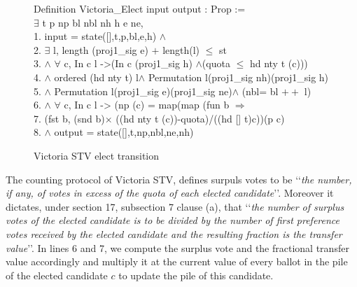\documentclass{llncs}
\begin{document}
\begin{scriptsize}
\begin{figure}[b]
{\selectfont
 Definition Victoria\_Elect \textsf{input} \textsf{output} : Prop :=\\ $\exists$ t p np bl nbl nh h e ne, \\
     1. \textsf{input} = \textsf{state}([],t,p,bl,e,h) $\wedge$\\
     2. $\exists$ l, \textsf{length} (proj1\_sig e) $+$ \textsf{length}(l)  $\leq$ st \\
  3. $\wedge$ $\forall$ c, In c l ->(In c (proj1\_sig h) $\wedge$(quota $\leq$ \textsf{hd} nty t (c)))\\
 4.   $\wedge$ \textsf{ordered} (\textsf{hd} nty t) l$\wedge$ \textsf{Permutation} l(proj1\_sig nh)(proj1\_sig h) \\
 5. $\wedge$ \textsf{Permutation} l(proj1\_sig e)(proj1\_sig ne)$\wedge$ (nbl= bl $++$ l)\\
 6. $\wedge$ $\forall$ c, In c l -> (np (c) = \textsf{map}(\textsf{map} (\textsf{fun} b $\Rightarrow$\\ 
 7. (\textsf{fst} b, (\textsf{snd} b)$\times$ ((\textsf{hd} nty t (c))-quota)/((\textsf{hd} [] t)c))(p c)\\
 8. $\wedge$ \textsf{output} = \textsf{state}([],t,np,nbl,ne,nh)
}
\caption{Victoria STV elect transition}
\label{fig;fig.3}
\end{figure}
\end{scriptsize}

The counting protocol of Victoria STV, defines surpuls votes to be \lq\lq \emph{the number, if any, of votes in excess of the
quota of each elected candidate}\rq\rq. Moreover it dictates, under section 17, subsection 7 clause (a), that \lq\lq  \emph{the number of surplus votes of the elected candidate is to be
divided by the number of first preference votes received by the
elected candidate and the resulting fraction is the transfer value}\rq\rq. In lines 6 and 7, we compute the surplus vote and the fractional transfer value accordingly and multiply it at the current value of every ballot in the pile of the elected candidate $c$ to update the pile of this candidate. 
\end{document}
